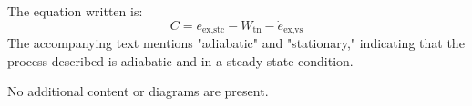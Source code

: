 The equation written is:  
\[
C = e_{\text{ex,stc}} - W_{\text{tn}} - \dot{e}_{\text{ex,vs}}
\]  
The accompanying text mentions "adiabatic" and "stationary," indicating that the process described is adiabatic and in a steady-state condition.

No additional content or diagrams are present.